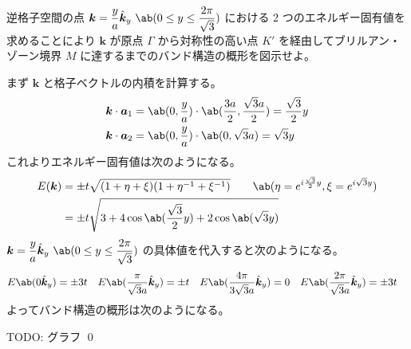 \documentclass[uplatex,dvipdfmx,a4paper,11pt]{jlreq}
\makeatletter
\renewcommand{\aa}{\bm{a}}
\newcommand{\kk}{\bm{k}}
\numberwithin{equation}{section}
\theoremstyle{definition}
\renewenvironment{proof}[1][\proofname]{\par
  \normalfont
  \topsep6\p@\@plus6\p@ \trivlist
  \item[\hskip\labelsep{\bfseries #1}\@addpunct{\bfseries}]\ignorespaces\quad\par
}{%
  \qed\endtrivlist\@endpefalse
}
\renewcommand\proofname{証明}
\makeatother
\begin{document}
\begin{problem}
逆格子空間の点 $\kk = \dfrac{y}{a}\hat{\kk}_y\ \ab(0 \leq y \leq \dfrac{2\pi}{\sqrt{3}})$ における 2 つのエネルギー固有値を求めることにより $\kk$ が原点 $\Gamma$ から対称性の高い点 $K'$ を経由してブリルアン・ゾーン境界 $M$ に達するまでのバンド構造の概形を図示せよ。
\end{problem}
\begin{proof}
  まず $\kk$ と格子ベクトルの内積を計算する。
  \begin{align}
    \kk\cdot\aa_1 & = \ab(0, \frac{y}{a})\cdot\ab(\frac{3a}{2}, \frac{\sqrt{3}a}{2}) = \frac{\sqrt{3}}{2}y \\
    \kk\cdot\aa_2 & = \ab(0, \frac{y}{a})\cdot\ab(0, \sqrt{3}a) = \sqrt{3}y
  \end{align}
  これよりエネルギー固有値は次のようになる。
  \begin{align}
    E(\kk) & = \pm t\sqrt{(1 + \eta + \xi)(1 + \eta^{-1} + \xi^{-1})} \qquad \ab(\eta = e^{i\frac{\sqrt{3}}{2}y}, \xi = e^{i\sqrt{3}y}) \\
           & = \pm t\sqrt{3 + 4\cos\ab(\frac{\sqrt{3}}{2}y) + 2\cos\ab(\sqrt{3}y)}
  \end{align}
  $\kk = \dfrac{y}{a}\hat{\kk}_y\ \ab(0 \leq y \leq \dfrac{2\pi}{\sqrt{3}})$ の具体値を代入すると次のようになる。
  \begin{align}
    E\ab(0\hat{\kk}_y) & = \pm 3t & E\ab(\frac{\pi}{\sqrt{3}a}\hat{\kk}_y) & = \pm t & E\ab(\frac{4\pi}{3\sqrt{3}a}\hat{\kk}_y) & = 0 & E\ab(\frac{2\pi}{\sqrt{3}a}\hat{\kk}_y) & = \pm 3t
  \end{align}
  よってバンド構造の概形は次のようになる。

  TODO: グラフ
\end{proof}
\end{document}
